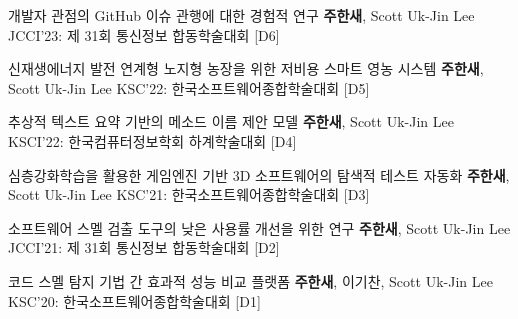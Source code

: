 \begin{cventries}
  \pbentry
  {개발자 관점의 GitHub 이슈 관행에 대한 경험적 연구 } %
  {\textbf{주한새}, Scott Uk-Jin Lee}
  {JCCI'23: 제 31회 통신정보 합동학술대회}
  {\href{https://github.com/Verssae/Verssae/blob/3f89da13976aaa5cbd1e3bdce61926b392d6e797/assets/papers/JCCI\%2023/\%EA\%B0\%9C\%EB\%B0\%9C\%EC\%9E\%90\%20\%EA\%B4\%80\%EC\%A0\%90\%EC\%9D\%98\%20GitHub\%20\%EC\%9D\%B4\%EC\%8A\%88\%20\%EA\%B4\%80\%ED\%96\%89\%EC\%97\%90\%20\%EB\%8C\%80\%ED\%95\%9C\%20\%EA\%B2\%BD\%ED\%97\%98\%EC\%A0\%81\%20\%EC\%97\%B0\%EA\%B5\%AC.pdf}{\paper}}
  {\href{https://github.com/Verssae/GIRT_analysis}{\githubCode}}
  {[D6]}

  \pbentry
  {신재생에너지 발전 연계형 노지형 농장을 위한 저비용 스마트 영농 시스템 } %
  {\textbf{주한새}, Scott Uk-Jin Lee}
  {KSC'22: 한국소프트웨어종합학술대회}
  {\href{https://www.dbpia.co.kr/Journal/articleDetail?nodeId=NODE11224052}{\paper}}
  {}
  {[D5]}

  \pbentry
  {추상적 텍스트 요약 기반의 메소드 이름 제안 모델 } %
  {\textbf{주한새}, Scott Uk-Jin Lee}
  {KSCI'22: 한국컴퓨터정보학회 하계학술대회}
  {\href{https://www.dbpia.co.kr/Journal/articleDetail?nodeId=NODE11140330}{\paper}}
  {}
  {[D4]}

  \pbentry
  {심층강화학습을 활용한 게임엔진 기반 3D 소프트웨어의 탐색적 테스트 자동화 } %
  {\textbf{주한새}, Scott Uk-Jin Lee}
  {KSC'21: 한국소프트웨어종합학술대회}
  {\href{https://www.dbpia.co.kr/Journal/articleDetail?nodeId=NODE11035659}{\paper}}
  {\href{https://github.com/Verssae/testing-ml-agents}{\githubCode}}
  {[D3]}

  \pbentry
  {소프트웨어 스멜 검출 도구의 낮은 사용률 개선을 위한 연구 } %
  {\textbf{주한새}, Scott Uk-Jin Lee}
  {JCCI'21: 제 31회 통신정보 합동학술대회}
  {\href{https://github.com/Verssae/Verssae/blob/3f89da13976aaa5cbd1e3bdce61926b392d6e797/assets/papers/JCCI\%2021/\%EC\%86\%8C\%ED\%94\%84\%ED\%8A\%B8\%EC\%9B\%A8\%EC\%96\%B4\%20\%EC\%8A\%A4\%EB\%A9\%9C\%20\%EA\%B2\%80\%EC\%B6\%9C\%20\%EB\%8F\%84\%EA\%B5\%AC\%EC\%9D\%98\%20\%EB\%82\%AE\%EC\%9D\%80\%20\%EC\%82\%AC\%EC\%9A\%A9\%EB\%A5\%A0\%20\%EA\%B0\%9C\%EC\%84\%A0\%EC\%9D\%84\%20\%EC\%9C\%84\%ED\%95\%9C\%20\%EC\%97\%B0\%EA\%B5\%AC.pdf}{\paper}}
  {}
  {[D2]}

  \pbentry
  {코드 스멜 탐지 기법 간 효과적 성능 비교 플랫폼 } %
  {\textbf{주한새}, 이기찬, Scott Uk-Jin Lee}
  {KSC'20: 한국소프트웨어종합학술대회}
  {\href{https://www.dbpia.co.kr/Journal/articleDetail?nodeId=NODE10529587}{\paper}}
  {}
  {[D1]}

\end{cventries}